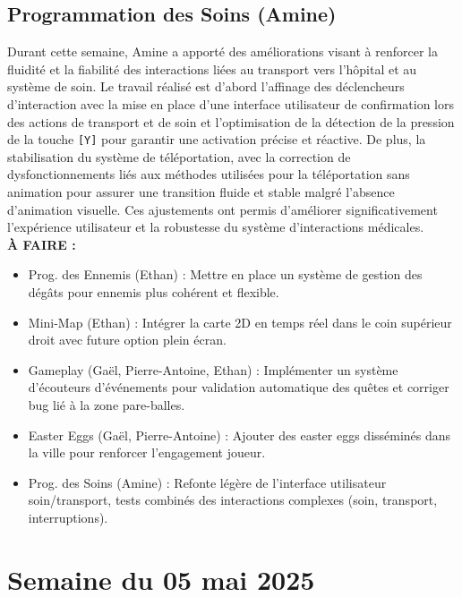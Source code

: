 \documentclass{report}
\begin{document}
\subsection*{Programmation des Soins (Amine)}
Durant cette semaine, Amine a apporté des améliorations visant à renforcer la fluidité et la fiabilité des interactions liées au transport vers l’hôpital et au système de soin. Le travail réalisé est d’abord l’affinage des déclencheurs d’interaction avec la mise en place d’une interface utilisateur de confirmation lors des actions de transport et de soin et l’optimisation de la détection de la pression de la touche \texttt{[Y]} pour garantir une activation précise et réactive. De plus, la stabilisation du système de téléportation, avec la correction de dysfonctionnements liés aux méthodes utilisées pour la téléportation sans animation pour assurer une transition fluide et stable malgré l’absence d’animation visuelle. Ces ajustements ont permis d’améliorer significativement l’expérience utilisateur et la robustesse du système d’interactions médicales.
\\[1cm]
\textbf{À FAIRE :}
\begin{itemize}
\item Prog. des Ennemis (Ethan) : Mettre en place un système de gestion des dégâts pour ennemis plus cohérent et flexible.
\item Mini-Map (Ethan) : Intégrer la carte 2D en temps réel dans le coin supérieur droit avec future option plein écran.
\item Gameplay (Gaël, Pierre-Antoine, Ethan) : Implémenter un système d’écouteurs d’événements pour validation automatique des quêtes et corriger bug lié à la zone pare-balles.
\item Easter Eggs (Gaël, Pierre-Antoine) : Ajouter des easter eggs disséminés dans la ville pour renforcer l’engagement joueur.
\item Prog. des Soins (Amine) : Refonte légère de l’interface utilisateur soin/transport, tests combinés des interactions complexes (soin, transport, interruptions).
\end{itemize}

\newpage
\section{Semaine du 05 mai 2025}
\end{document}
